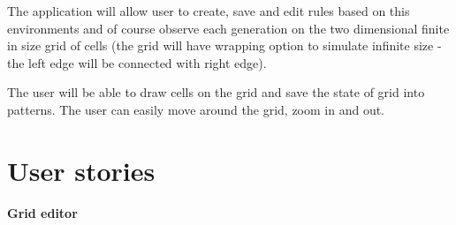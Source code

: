 \documentclass{article}
\begin{document}
\par The application will allow user to create, save and edit rules based on this environments and of course observe each generation on the two dimensional finite in size grid of cells
(the grid will have wrapping option to simulate infinite size - the left edge will be connected with right edge).

\par The user will be able to draw cells on the grid and save the state of grid into patterns.
The user can easily move around the grid, zoom in and out.

\newpage
\section{User stories}
	\hspace{15pt} {\bf Grid editor}
\end{document}
